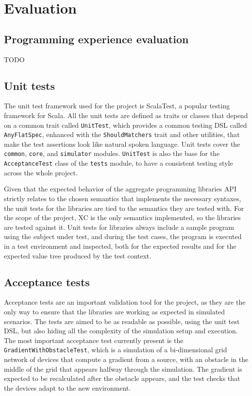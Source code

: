 \chapter{Evaluation}
\label{chap:evaluation}

\section{Programming experience evaluation}

TODO

\section{Unit tests}

The unit test framework used for the project is ScalaTest, a popular testing framework for Scala.
%
All the unit tests are defined as traits or classes that depend on a common trait called \texttt{UnitTest}, which provides a common testing \ac{DSL} called \texttt{AnyFlatSpec}, enhanced with the \texttt{ShouldMatchers} trait and other utilities, that make the test assertions look like natural spoken language.
%
Unit tests cover the \texttt{common}, \texttt{core}, and \texttt{simulator} modules.
%
\texttt{UnitTest} is also the base for the \texttt{AcceptanceTest} class of the \texttt{tests} module, to have a consistent testing style across the whole project.

Given that the expected behavior of the aggregate programming libraries \ac{API} strictly relates to the chosen semantics that implements the necessary syntaxes, the unit tests for the libraries are tied to the semantics they are tested with.
%
For the scope of the project, \ac{XC} is the only semantics implemented, so the libraries are tested against it.
%
Unit tests for libraries always include a sample program using the subject under test, and during the test cases, the program is executed in a test environment and inspected, both for the expected results and for the expected value tree produced by the test context.

\section{Acceptance tests}

Acceptance tests are an important validation tool for the project, as they are the only way to ensure that the libraries are working as expected in simulated scenarios.
%
The tests are aimed to be as readable as possible, using the unit test \ac{DSL}, but also hiding all the complexity of the simulation setup and execution.
%
The most important acceptance test currently present is the \texttt{GradientWithObstacleTest}, which is a simulation of a bi-dimensional grid network of devices that compute a gradient from a source, with an obstacle in the middle of the grid that appears halfway through the simulation.
%
The gradient is expected to be recalculated after the obstacle appears, and the test checks that the devices adapt to the new environment.

